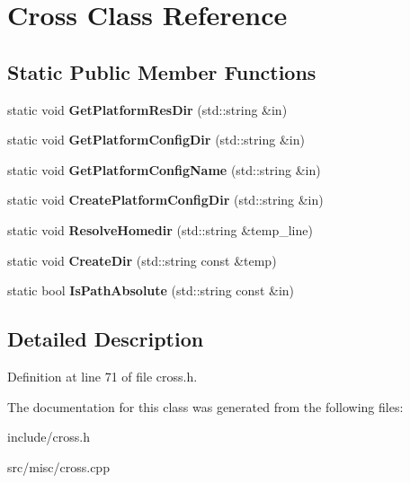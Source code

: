 \hypertarget{classCross}{\section{Cross Class Reference}
\label{classCross}
}
\subsection*{Static Public Member Functions}
\begin{DoxyCompactItemize}
\item 
\hypertarget{classCross_a73843b748a4bb6c2d4167407cd893676}{static void {\bfseries Get\-Platform\-Res\-Dir} (std\-::string \&in)}\label{classCross_a73843b748a4bb6c2d4167407cd893676}

\item 
\hypertarget{classCross_ae970b76d2aaead7f55e7b1a05574a880}{static void {\bfseries Get\-Platform\-Config\-Dir} (std\-::string \&in)}\label{classCross_ae970b76d2aaead7f55e7b1a05574a880}

\item 
\hypertarget{classCross_a76229c50352b8f4f44dbcd68a7fb4f7d}{static void {\bfseries Get\-Platform\-Config\-Name} (std\-::string \&in)}\label{classCross_a76229c50352b8f4f44dbcd68a7fb4f7d}

\item 
\hypertarget{classCross_ac95e21d0ca9ec1e467b680e9bdbbfc33}{static void {\bfseries Create\-Platform\-Config\-Dir} (std\-::string \&in)}\label{classCross_ac95e21d0ca9ec1e467b680e9bdbbfc33}

\item 
\hypertarget{classCross_ac79890893bb87e04d37f8d2935cc80a8}{static void {\bfseries Resolve\-Homedir} (std\-::string \&temp\-\_\-line)}\label{classCross_ac79890893bb87e04d37f8d2935cc80a8}

\item 
\hypertarget{classCross_a9674b6158cf06a616ba6f899f72693b2}{static void {\bfseries Create\-Dir} (std\-::string const \&temp)}\label{classCross_a9674b6158cf06a616ba6f899f72693b2}

\item 
\hypertarget{classCross_aed9b05e77ca4087abed9cfd0460c7408}{static bool {\bfseries Is\-Path\-Absolute} (std\-::string const \&in)}\label{classCross_aed9b05e77ca4087abed9cfd0460c7408}

\end{DoxyCompactItemize}


\subsection{Detailed Description}


Definition at line 71 of file cross.\-h.



The documentation for this class was generated from the following files\-:\begin{DoxyCompactItemize}
\item 
include/cross.\-h\item 
src/misc/cross.\-cpp\end{DoxyCompactItemize}
